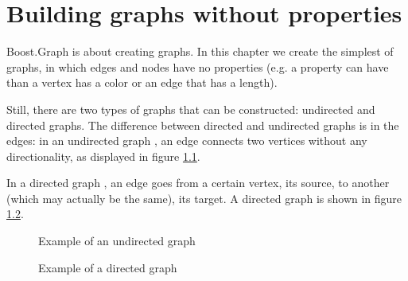 \chapter{Building graphs without properties}
\label{sec:Building-graphs-without-properties}

Boost.Graph is about creating graphs.
In this chapter we create the simplest of graphs, 
in which edges and nodes
have no properties (e.g. a property can have than a vertex has
a color or an edge that has a length).

Still, there are two types of graphs that can be constructed: 
undirected and directed graphs.
The difference between directed and undirected graphs is in the edges:
in an undirected graph ,
an edge connects two vertices without any directionality, as displayed
in figure \ref{fig:undirected_graph_example}.

In a directed graph , 
an edge goes from a certain vertex, 
its source, to another (which may actually be the same), its target.
A directed graph is shown in figure \ref{fig:directed_graph_example}.

\begin{figure}
  \caption{Example of an undirected graph}
  \label{fig:undirected_graph_example}
\end{figure}

\begin{figure}
  \caption{Example of a directed graph}
  \label{fig:directed_graph_example}
\end{figure}

